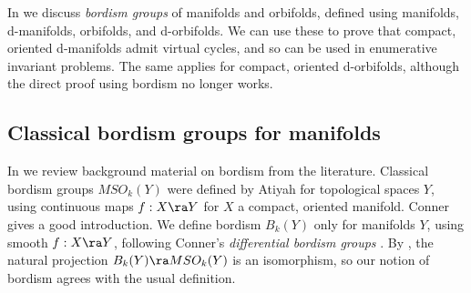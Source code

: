 \documentclass{article}
\begin{document}
In \cite[Chap.~13]{Joyc6} we discuss {\it bordism groups\/} of
manifolds and orbifolds, defined using manifolds, d-manifolds,
orbifolds, and d-orbifolds. We can use these to prove that compact,
oriented d-manifolds admit virtual cycles, and so can be used in
enumerative invariant problems. The same applies for compact,
oriented d-orbifolds, although the direct proof using bordism no
longer works.

\subsection{Classical bordism groups for manifolds}
\label{ds151}

In \cite[\S 13.1]{Joyc6} we review background material on bordism
from the literature. Classical bordism groups $MSO_k(Y)$ were
defined by Atiyah \cite{Atiy} for topological spaces $Y$, using
continuous maps $f:X\ra Y$ for $X$ a compact, oriented manifold.
Conner \cite[\S I]{Conn} gives a good introduction. We define
bordism $B_k(Y)$ only for manifolds $Y$, using smooth $f:X\ra Y$,
following Conner's {\it differential bordism groups\/} \cite[\S
I.9]{Conn}. By \cite[Th.~I.9.1]{Conn}, the natural projection
$B_k(Y)\ra MSO_k(Y)$ is an isomorphism, so our notion of bordism
agrees with the usual definition.
\end{document}

